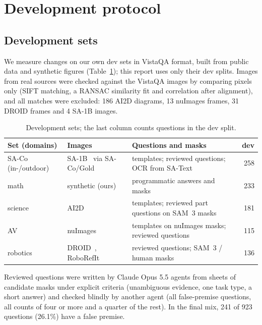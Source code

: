 \documentclass{article}
\begin{document}
\section{Development protocol}
\label{sec:dev}

\subsection{Development sets}

We measure changes on our own dev sets in VistaQA format, built from public data and synthetic figures (Table~\ref{tab:devsets});
this report uses only their dev splits.
Images from real sources were checked against the VistaQA images by comparing pixels only
(SIFT matching, a RANSAC similarity fit and correlation after alignment),
and all matches were excluded: 186 AI2D diagrams, 13 nuImages frames, 31 DROID frames and 4 SA-1B images.

\begin{table}[t]
  \caption{Development sets; the last column counts questions in the dev split.}
  \label{tab:devsets}
  \centering
  \footnotesize
  \begin{tabularx}{\linewidth}{@{}llXr@{}}
    \toprule
    Set (domains) & Images & Questions and masks & dev \\
    \midrule
    SA-Co (in-/outdoor) & SA-1B~\citep{sam} via SA-Co/Gold~\citep{sam3} & templates; reviewed questions; OCR from SA-Text~\citep{satext} & 258 \\
    math & synthetic (ours) & programmatic answers and masks & 233 \\
    science & AI2D~\citep{ai2d} & templates; reviewed part questions on SAM~3 masks & 181 \\
    AV & nuImages~\citep{nuscenes} & templates on nuImages masks; reviewed questions & 115 \\
    robotics & DROID~\citep{droid}, RoboRefIt~\citep{roborefit} & reviewed questions; SAM~3 / human masks & 136 \\
    \bottomrule
  \end{tabularx}
\end{table}

Reviewed questions were written by Claude Opus 5.5 agents from sheets of candidate masks under explicit criteria
(unambiguous evidence, one task type, a short answer)
and checked blindly by another agent (all false-premise questions, all counts of four or more and a quarter of the rest).
In the final mix, 241 of 923 questions (26.1\%) have a false premise.
\end{document}
